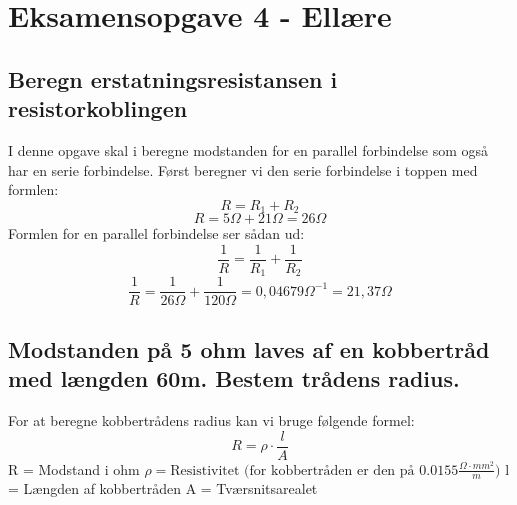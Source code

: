 \section{Eksamensopgave 4 - Ellære}
\subsection{Beregn erstatningsresistansen i resistorkoblingen}
I denne opgave skal i beregne modstanden for en parallel forbindelse som også har en serie forbindelse.
Først beregner vi den serie forbindelse i toppen med formlen:
\begin{equation*}
    R=R_{1}+R_{2}
\end{equation*}
\begin{equation*}
    R=5\Omega+21\Omega=26\Omega
\end{equation*}
Formlen for en parallel forbindelse ser sådan ud:
\begin{equation*}
    \frac{1}{R}=\frac{1}{R_{1}}+\frac{1}{R_{2}}
\end{equation*}
\begin{equation*}
    \frac{1}{R}=\frac{1}{26\Omega}+\frac{1}{120\Omega}=0,04679\Omega^{-1}=21,37\Omega
\end{equation*}

\subsection{Modstanden på 5 ohm laves af en kobbertråd med længden 60m. Bestem trådens radius.}
For at beregne kobbertrådens radius kan vi bruge følgende formel:
\begin{equation*}
    R=\rho\cdot\frac{l}{A}
\end{equation*}
R = Modstand i ohm\newline
\begin{math}
    \rho = \text{Resistivitet (for kobbertråden er den på } 0.0155 \frac{\Omega \cdot mm^{2}}{m})
\end{math}\newline
l = Længden af kobbertråden\newline
A = Tværsnitsarealet\newline

